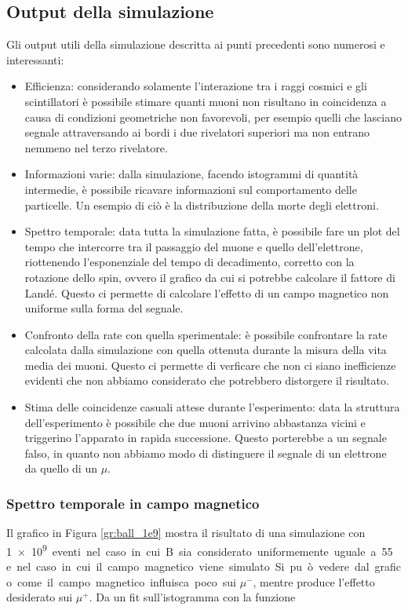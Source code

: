\subsection{Output della simulazione}
Gli output utili della simulazione descritta ai punti precedenti sono numerosi e interessanti:
\begin{itemize}
\item Efficienza: considerando solamente l'interazione tra i raggi cosmici e gli scintillatori è possibile stimare quanti muoni non risultano in coincidenza a causa
di condizioni geometriche non favorevoli, per esempio quelli che lasciano segnale attraversando ai bordi i due rivelatori superiori ma non entrano nemmeno nel terzo
rivelatore.
\item Informazioni varie: dalla simulazione, facendo istogrammi di quantit\`a intermedie, \`e possibile ricavare informazioni sul comportamento delle particelle. Un esempio di ci\`o \`e la distribuzione della morte degli elettroni.
\item Spettro temporale: data tutta la simulazione fatta, è possibile fare un plot del tempo che intercorre tra il passaggio del muone e quello dell'elettrone, riottenendo
l'esponenziale del tempo di decadimento, corretto con la rotazione dello spin, ovvero il grafico da cui si potrebbe calcolare il fattore di Land\'e. Questo ci permette di calcolare l'effetto di un campo magnetico non uniforme sulla forma del segnale.
\item Confronto della rate con quella sperimentale: \`e possibile confrontare la rate calcolata dalla simulazione con quella ottenuta durante la misura della vita media dei muoni. Questo ci permette di verficare che non ci siano inefficienze evidenti che non abbiamo considerato che potrebbero distorgere il risultato.
\item Stima delle coincidenze casuali attese durante l'esperimento: data la struttura dell'esperimento \`e possibile che due muoni arrivino abbastanza vicini e triggerino l'apparato in rapida successione. Questo porterebbe a un segnale falso, in quanto non abbiamo modo di distinguere il segnale di un elettrone da quello di un $\mu$.
\end{itemize}

\subsubsection{Spettro temporale in campo magnetico}
Il grafico in Figura \ref{gr:ball_1e9} mostra il risultato di una simulazione con \SI{1e9} eventi nel caso in cui B sia considerato uniformemente uguale a \SI{55}{\gauss} e nel caso in cui il campo magnetico viene simulato. 
Si pu\`o vedere dal grafico come il campo magnetico influisca poco sui $\mu^-$, mentre produce l'effetto desiderato sui $\mu^+$. 
Da un fit sull'istogramma con la funzione

